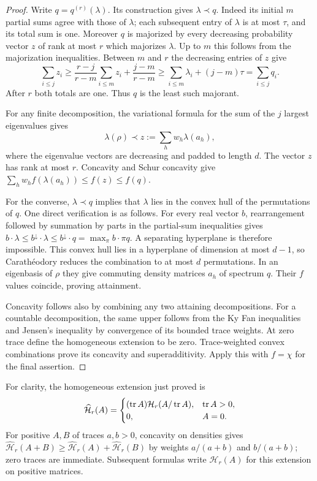 \begin{proof}
Write $q=q^{(r)}(\lambda)$.  Its construction gives $\lambda\prec q$.
Indeed its initial $m$ partial sums agree with those of $\lambda$;
each subsequent entry of $\lambda$ is at most $\tau$, and its total
sum is one.  Moreover $q$ is majorized by every decreasing probability
vector $z$ of rank at most $r$ which majorizes $\lambda$.  Up to $m$
this follows from the majorization inequalities.  Between $m$ and $r$
the decreasing entries of $z$ give
\[
 \sum_{i\le j}z_i\ge
 \frac{r-j}{r-m}\sum_{i\le m}z_i+\frac{j-m}{r-m}
 \ge\sum_{i\le m}\lambda_i+(j-m)\tau
                   =\sum_{i\le j}q_i.
\]
After $r$ both totals are one.  Thus $q$ is the least such majorant.

For any finite decomposition, the variational formula for the sum of
the $j$ largest eigenvalues gives
\[
 \lambda(\rho)\prec z:=\sum_hw_h\lambda(a_h),
\]
where the eigenvalue vectors are decreasing and padded to length $d$.
The vector $z$ has rank at most $r$.  Concavity and Schur concavity give
$\sum_hw_hf(\lambda(a_h))\le f(z)\le f(q)$.

For the converse, $\lambda\prec q$ implies that $\lambda$ lies in the
convex hull of the permutations of $q$.  One direct verification is
as follows.  For every real vector $b$, rearrangement followed by
summation by parts in the partial-sum inequalities gives
$b\cdot\lambda\le b^\downarrow\cdot\lambda
 \le b^\downarrow\cdot q=\max_\pi b\cdot\pi q$.
A separating hyperplane is therefore impossible.  This convex hull
lies in a hyperplane of dimension at most $d-1$, so Carath\'eodory
reduces the combination to at most $d$ permutations.  In an eigenbasis
of $\rho$ they give commuting density matrices $a_h$ of spectrum $q$.
Their $f$ values coincide, proving attainment.

Concavity follows also by combining any two attaining decompositions.
For a countable decomposition, the same upper follows from the Ky Fan
inequalities and Jensen's inequality by convergence of its bounded
trace weights.  At zero trace define the homogeneous extension to be
zero.  Trace-weighted convex combinations prove its concavity and
superadditivity.  Apply this with $f=\chi$ for the final assertion.
\end{proof}

For clarity, the homogeneous extension just proved is
\[
 \widehat{\mathcal H}_r(A)=
 \begin{cases}
  (\operatorname{tr} A)\mathcal H_r(A/\operatorname{tr} A),&\operatorname{tr} A>0,\\
  0,&A=0.
 \end{cases}
\]
For positive $A,B$ of traces $a,b>0$, concavity on densities gives
$\widehat{\mathcal H}_r(A+B)\ge
\widehat{\mathcal H}_r(A)+\widehat{\mathcal H}_r(B)$ by weights
$a/(a+b)$ and $b/(a+b)$; zero traces are immediate.  Subsequent formulas
write $\mathcal H_r(A)$ for this extension on positive matrices.

